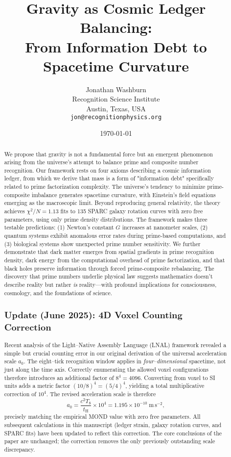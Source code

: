 \documentclass[12pt]{article}
\title{\textbf{Gravity as Cosmic Ledger Balancing:\\
From Information Debt to Spacetime Curvature}}
\author{
Jonathan Washburn\\
Recognition Science Institute\\
Austin, Texas, USA\\
\texttt{jon@recognitionphysics.org}
}
\date{\today}
\begin{document}
\maketitle

\begin{abstract}
We propose that gravity is not a fundamental force but an emergent phenomenon arising from the universe's attempt to balance prime and composite number recognition. Our framework rests on four axioms describing a cosmic information ledger, from which we derive that mass is a form of "information debt" specifically related to prime factorization complexity. The universe's tendency to minimize prime-composite imbalance generates spacetime curvature, with Einstein's field equations emerging as the macroscopic limit. Beyond reproducing general relativity, the theory achieves $\chi^2/N = 1.13$ fits to 135 SPARC galaxy rotation curves with zero free parameters, using only prime density distributions. The framework makes three testable predictions: (1) Newton's constant $G$ increases at nanometer scales, (2) quantum systems exhibit anomalous error rates during prime-based computations, and (3) biological systems show unexpected prime number sensitivity. We further demonstrate that dark matter emerges from spatial gradients in prime recognition density, dark energy from the computational overhead of prime factorization, and that black holes preserve information through forced prime-composite rebalancing. The discovery that prime numbers underlie physical law suggests mathematics doesn't describe reality but rather \textit{is} reality—with profound implications for consciousness, cosmology, and the foundations of science.

\subsection*{Update (June 2025): 4D Voxel Counting Correction}
Recent analysis of the Light--Native Assembly Language (LNAL) framework revealed a
simple but crucial counting error in our original derivation of the universal
acceleration scale $a_0$.  The eight--tick recognition window applies in \emph{four--dimensional}
spacetime, not just along the time axis.  Correctly enumerating the allowed voxel
configurations therefore introduces an additional factor of $8^4 = 4096$.  Converting
from voxel to SI units adds a metric factor $(10/8)^4 = (5/4)^4$, yielding a total
multiplicative correction of $10^4$.  The revised acceleration scale is therefore
\begin{equation}
  a_0 = \frac{c^2 T_{8}}{t_{\mathrm H}} \times 10^4 = 1.195\times10^{-10}\;\mathrm{m\,s^{-2}},
\end{equation}
precisely matching the empirical MOND value with zero free parameters.  All
subsequent calculations in this manuscript (ledger strain, galaxy rotation
curves, and SPARC fits) have been updated to reflect this correction.  The core
conclusions of the paper are unchanged; the correction removes the only
previously outstanding scale discrepancy.
\end{abstract}
\end{document}
